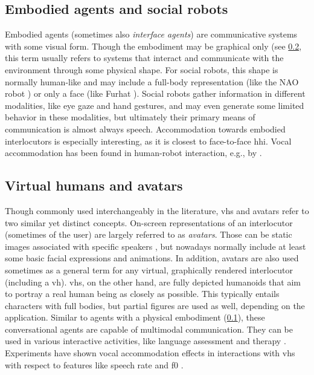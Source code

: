 \subsection{Embodied agents and social robots}
\label{subsec:embodied_agents}

Embodied agents (sometimes also \emph{interface agents}) are communicative systems with some visual form.
Though the embodiment may be graphical only (see \cref{subsec:virtual_humans}, this term usually refers to systems that interact and communicate with the environment through some physical shape.
For social robots, this shape is normally human-like and may include a full-body representation (like the NAO robot \citep{Singh2016nao}) or only a face (like Furhat \citep{AlMoubayed2012furhat}).
Social robots gather information in different modalities, like eye gaze and hand gestures, and may even generate some limited behavior in these modalities, but ultimately their primary means of communication is almost always speech.
Accommodation towards embodied interlocutors is especially interesting, as it is closest to face-to-face \ac{hhi}.
Vocal accommodation has been found in human-robot interaction, e.g., by \citet{Ibrahim2019fundamental}.

\subsection{Virtual humans and avatars}
\label{subsec:virtual_humans}

Though commonly used interchangeably in the literature, \acp{vh} and avatars refer to two similar yet distinct concepts.
On-screen representations of an interlocutor (sometimes of the user) are largely referred to as \emph{avatars}.
Those can be static images associated with specific speakers \citep[as in][]{Cohn2020Interspeech}, but nowadays normally include at least some basic facial expressions and animations.
In addition, avatars are also used sometimes as a general term for any virtual, graphically rendered interlocutor (including a \ac{vh}).
\Acp{vh}, on the other hand, are fully depicted humanoids that aim to portray a real human being as closely as possible.
This typically entails characters with full bodies, but partial figures are used as well, depending on the application.
Similar to agents with a physical embodiment (\cref{subsec:embodied_agents}), these conversational agents are capable of multimodal communication.
They can be used in various interactive activities, like language assessment \citep{Peterson2005learning} and therapy \citep{Devault2014simsensei}.
Experiments have shown vocal accommodation effects in interactions with \acp{vh} with respect to features like speech rate and \ac{f0} \citep{Gijssels2016speech, Staum2010virtually}.

